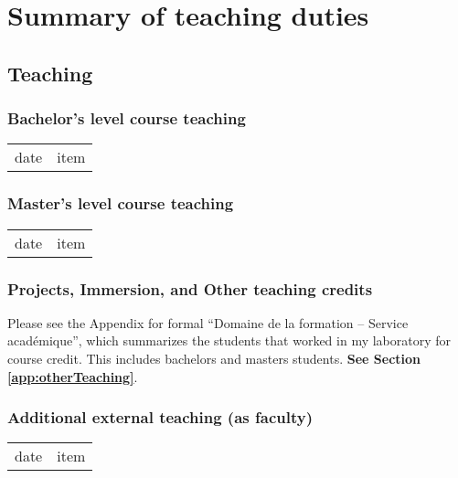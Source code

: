 \chapter{Summary of teaching duties}
\label{teaching}

\vspace{-10mm}

\section{Teaching}

\subsection{Bachelor's level course teaching}
\begin{tabular}[l]{ p{} p{} }
date & item\\
\end{tabular} 

\subsection{Master's level course teaching}
\begin{tabular}[l]{ p{} p{} }
date & item\\
\end{tabular} 

\subsection{Projects, Immersion, and Other teaching credits}

Please see the Appendix for formal ``Domaine de la formation -- Service académique'', which summarizes the students that worked in my laboratory for course credit. This includes bachelors and masters students. \textbf{See Section \ref{app:otherTeaching}}.


\subsection{Additional external teaching (as faculty)}
\begin{tabular}[l]{ p{} p{} }
date & item\\
\end{tabular} 
